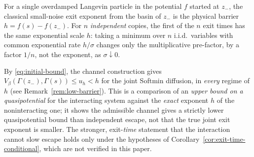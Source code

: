 \documentclass{opt2026} %
\begin{document}
\begin{remark}
\label{rem:comparison}
For a single overdamped Langevin particle in the potential $f$ started at $z_-$, the classical small-noise exit exponent from the basin of $z_-$ is the physical barrier $h=f(s)-f(z_-)$. For $n$ \emph{independent} copies, the first of the $n$ exit times has the same exponential scale $h$: taking a minimum over $n$ i.i.d.\ variables with common exponential rate $h/\sigma$ changes only the multiplicative pre-factor, by a factor $1/n$, not the exponent, as $\sigma\downarrow0$.

By \eqref{eq:initial-bound}, the channel construction gives $V_\beta(\Gamma(z_-),\Gamma(s))\le u_h<h$ for the joint Softmin diffusion, in \emph{every} regime of $h$ (see Remark~\ref{rem:low-barrier}). This is a comparison of an \emph{upper bound on a quasipotential} for the interacting system against the \emph{exact} exponent $h$ of the noninteracting one; it shows the admissible channel gives a strictly lower quasipotential bound than independent escape, not that the true joint exit exponent is smaller. The stronger, exit-\emph{time} statement that the interaction cannot slow escape holds only under the hypotheses of Corollary~\ref{cor:exit-time-conditional}, which are not verified in this paper.
\end{remark}
\end{document}
